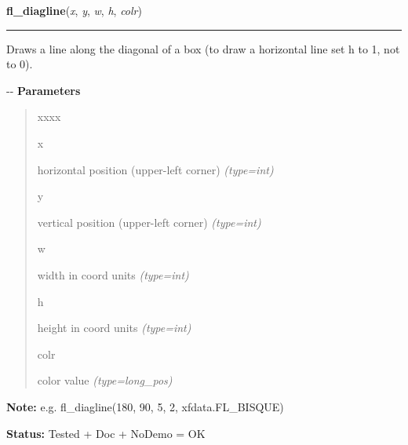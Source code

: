     \label{xformslib:flxbasic:fl_diagline}

    \vspace{0.5ex}

\hspace{.8\funcindent}\begin{boxedminipage}{\funcwidth}

    \raggedright \textbf{fl\_diagline}(\textit{x}, \textit{y}, \textit{w}, \textit{h}, \textit{colr})

    \vspace{-1.5ex}

    \rule{\textwidth}{0.5\fboxrule}
\setlength{\parskip}{2ex}

Draws a line along the diagonal of a box (to draw a horizontal line
set h to 1, not to 0).

-{}-
\setlength{\parskip}{1ex}
      \textbf{Parameters}
      \vspace{-1ex}

      \begin{quote}
        \begin{Ventry}{xxxx}

          \item[x]


horizontal position (upper-left corner)
            {\it (type=int)}

          \item[y]


vertical position (upper-left corner)
            {\it (type=int)}

          \item[w]


width in coord units
            {\it (type=int)}

          \item[h]


height in coord units
            {\it (type=int)}

          \item[colr]


color value
            {\it (type=long\_pos)}

        \end{Ventry}

      \end{quote}

\textbf{Note:} 
e.g. fl\_diagline(180, 90, 5, 2, xfdata.FL\_BISQUE)


\textbf{Status:} 
Tested + Doc + NoDemo = OK


    \end{boxedminipage}

